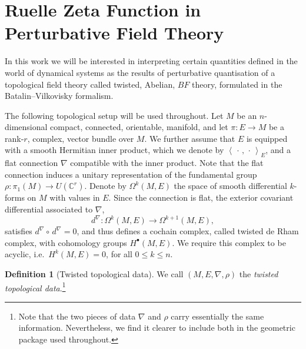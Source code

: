 \documentclass[reqno]{amsart}
\theoremstyle{definition}
\newtheorem{defn}[thm]{Definition}
\theoremstyle{remark}
\newcommand{\pair}[2]{\left\langle #1,\, #2 \right\rangle}
\begin{document}
\section{Ruelle Zeta Function in Perturbative Field Theory}\label{sec:RuelleZetaFT}


In this work we will be interested in interpreting certain quantities defined in the world of dynamical systems as the results of perturbative quantisation of a topological field theory called twisted, Abelian, $BF$ theory, formulated in the Batalin--Vilkovisky formalism.

The following topological setup will be used throughout. Let $M$ be an $n$-dimensional compact, connected, orientable, manifold, and let $\pi\colon E\to M$ be a rank-$r$, complex, vector bundle over $M$. We further assume that $E$ is equipped with a smooth Hermitian inner product, which we denote by $\pair{\,\cdot\,}{\cdot\,}_E$, and a flat connection $\nabla$ compatible with the inner product. Note that the flat connection induces a unitary representation of the fundamental group $\rho: \pi_1(M) \to U(\mathbb{C}^r)$. Denote by $\Omega^k(M,E)$ the space of smooth differential $k$-forms on $M$ with values in $E$. Since the connection is flat, the exterior covariant differential associated to $\nabla$,
\[ d^\nabla \colon \Omega^k(M,E) \to \Omega^{k+1}(M,E), \]
satisfies $d^\nabla\! \circ\, d^\nabla = 0$, and thus defines a cochain complex, called twisted de Rham complex, with cohomology groups $H^\bullet(M,E)$. We require this complex to be acyclic, i.e.\ $H^k(M,E) = 0$, for all $0\le k\le n$.
\begin{defn}[Twisted topological data]\label{def:TTD}
We call $(M,E,\nabla,\rho)$ the \emph{twisted topological data}.\footnote{Note that the two pieces of data $\nabla$ and $\rho$ carry essentially the same information. Nevertheless, we find it clearer to include both in the geometric package used throughout.}
\end{defn}
\end{document}
